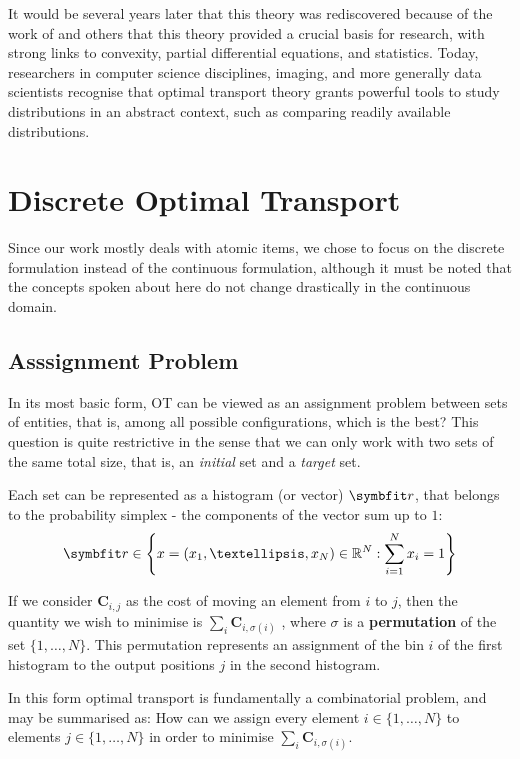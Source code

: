 It would be several years later that this theory was rediscovered because of the work of \textcite{Brenier1991PolarFunctions} and others that this theory provided a crucial basis for research, with strong links to convexity, partial differential equations, and statistics. Today, researchers in computer science disciplines, imaging, and more generally data scientists recognise that optimal transport theory grants powerful tools to study distributions in an abstract context, such as comparing readily available distributions.

\section{Discrete Optimal Transport}\label{sec:discrete-ot}

Since our work mostly deals with atomic items, we chose to focus on the discrete formulation instead of the continuous formulation, although it must be noted that the concepts spoken about here do not change drastically in the continuous domain.

\subsection{Asssignment Problem}\label{ssec:ot-assignment-prob}

In its most basic form, OT can be viewed as an assignment problem between sets of entities, that is, among all possible configurations, which is the best? This question is quite restrictive in the sense that we can only work with two sets of the same total size, that is, an \textit{initial} set and a \textit{target} set.

Each set can be represented as a histogram (or vector) $\bfitr$, that belongs to the probability simplex - the components of the vector sum up to $1$:
\begin{equation}
    \bfitr \in \left\{ x = (x_1, …, x_N) \in \mathbb{R}^N : \sum_{i=1}^N x_i = 1 \right\} 
    \label{eqn:r-simplex-defn}
\end{equation}

If we consider $\symbf{C}_{i,j}$ as the cost of moving an element from $i$ to $j$, then the quantity we wish to minimise is $\sum_{i} \symbf{C}_{i,\sigma(i)}$ , where $\sigma$ is a \textbf{permutation} of the set $\{1,\ldots, N\}$. This permutation represents an assignment of the bin $i$ of the first histogram to the output positions $j$ in the second histogram.

In this form optimal transport is fundamentally a combinatorial problem, and may be summarised as: 
How can we assign every element $i \in \{1, \ldots, N\}$ to elements $j \in \{1, \ldots, N\}$ in order to minimise $\sum_{i} \symbf{C}_{i,\sigma(i)}$.

